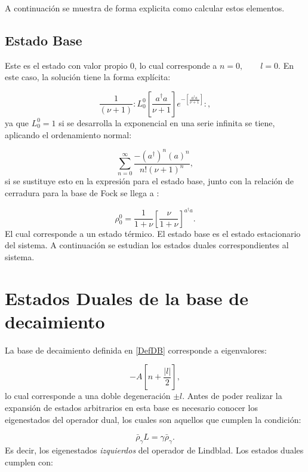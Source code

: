 \documentclass[a4paper,10pt]{report}
\begin{document}
A continuación se muestra de forma explicita como calcular estos elementos. 

\subsection{Estado Base}

Este es el estado con valor propio 0, lo cual corresponde a $n=0, \qquad l=0$. En este caso, la solución tiene la forma explícita:

\begin{equation}
\frac{1}{(\nu+1)}:L_0^0[\frac{a^\dagger a}{\nu+1}]e^{-[\frac{a^\dagger a}{\nu+1}]}:,
\end{equation} ya que $L_0^0 = 1$ \cite{ArfkenMM} si se desarrolla la exponencial en una serie infinita se tiene, aplicando el ordenamiento normal:

\begin{equation}
\sum_{n=0}^\infty \frac{-(a^\dagger)^n (a)^n}{n!(\nu+1)^n},
\end{equation} si se sustituye esto en la expresión para el estado base, junto con la relación de cerradura para la base de Fock se llega a \cite{EnglertDB}:

\begin{equation}
\rho_0^0 = \frac{1}{1+\nu} [\frac{\nu}{1+\nu}]^{a^\dagger a}.
\end{equation}El cual corresponde a un estado térmico\cite{EnglertDB}. El estado base es el estado estacionario del sistema. A continuación se estudian los estados duales correspondientes al sistema.

\section{Estados Duales de la base de decaimiento}

La base de decaimiento \cite{EnglertDB} definida en \ref{DefDB} corresponde a eigenvalores:

\begin{equation}
 -A[n+\frac{|l|}{2}],
\end{equation}lo cual corresponde a una doble degeneración $\pm l$. Antes de poder realizar la expansión de estados arbitrarios en esta base es necesario conocer los eigenestados del operador dual, los cuales son aquellos que cumplen la condición\cite{EnglertDB}:

\begin{equation}
\bar{\rho}_\gamma L = \gamma\bar{\rho}_\gamma.
\end{equation} Es decir, los eigenestados \textit{izquierdos} del operador de Lindblad. Los estados duales cumplen con:
\end{document}
